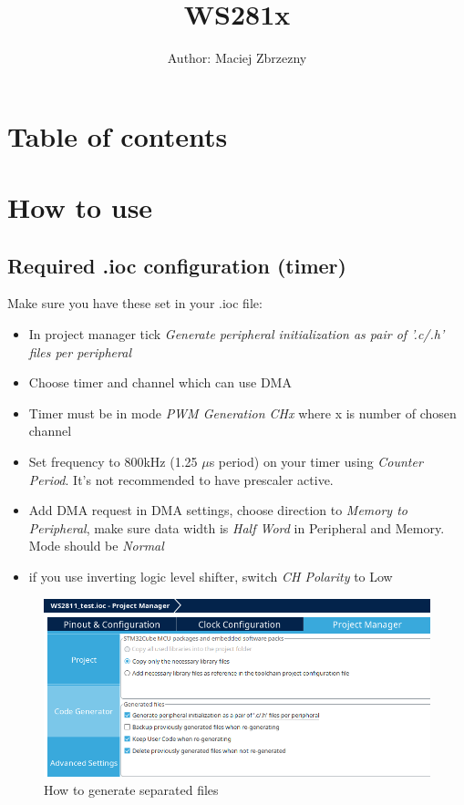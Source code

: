 \documentclass[]{article}
\title{WS281x}
\author{Author: Maciej Zbrzezny}
\date{}
\begin{document}
	\maketitle
	\pagestyle{fancy}
	\lhead{}
	\chead{}
	\lfoot{}
	\section*{Table of contents}
	\cfoot{\hyperlink{}{\thepage}}
	\tableofcontents
	\newpage
	\section{How to use}
	\subsection{Required .ioc configuration (timer)}
	Make sure you have these set in your .ioc file:
	\begin{itemize}
		\item In project manager tick \textit{Generate peripheral initialization as pair of '.c/.h' files per peripheral}
		\item Choose timer and channel which can use DMA
		\item Timer must be in mode \textit{PWM Generation CHx} where x is number of chosen channel
		\item Set frequency to 800kHz (1.25 $\mu$s period) on your timer using \textit{Counter Period}. It's not recommended to have prescaler active.
		\item Add DMA request in DMA settings, choose direction to \textit{Memory to Peripheral}, make sure data width is \textit{Half Word} in Peripheral and Memory. Mode should be \textit{Normal} 
		\item if you use inverting logic level shifter, switch \textit{CH Polarity} to Low
	\end{itemize}
	\begin{minipage}{0.5\textwidth}
		\begin{figure}[H]
			\centering
			\includegraphics[width=0.9\linewidth]{separatedfiles}
			\caption{How to generate separated files}
			\label{fig:separatedfiles}
		\end{figure}
				
	\end{minipage}
\end{document}
